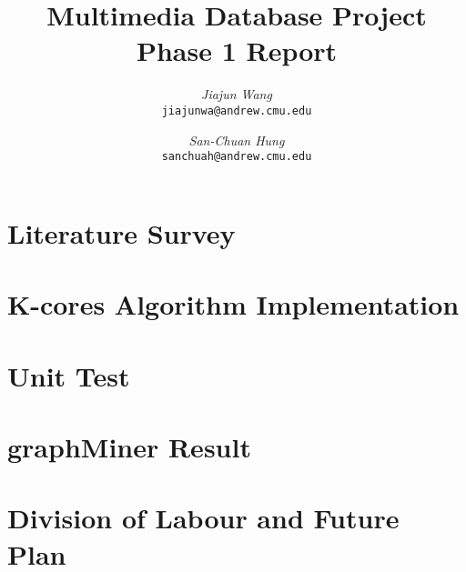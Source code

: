 \documentclass[12pt]{article}
\begin{document}
\newcommand{\beq}{\begin{equation}}
\newcommand{\eeq}{\end{equation}}
\newcommand{\bit}{\begin{itemize*}}
\newcommand{\eit}{\end{itemize*}}
\newcommand{\goal}[1]{ {\noindent {$\Rightarrow$} \em {#1} } }
\newcommand{\hide}[1]{}
\newcommand{\comment}[1]{ {\footnotesize {#1} } }
\newtheorem{lemma}{Lemma}
\newtheorem{theorem}{Theorem}
\newtheorem{proof}{Proof}
\newtheorem{defn}{Definition}
\newtheorem{algo}{Algorithm}
\newtheorem{observation}{Observation}

\title{Multimedia Database Project Phase 1 Report}


\author{ {\em Jiajun Wang} \\
	    {\tt jiajunwa@andrew.cmu.edu}
	 \and
	 {\em San-Chuan Hung} \\
	     {\tt sanchuah@andrew.cmu.edu}
}

\maketitle
\section{Literature Survey}
    \label{sec:survey}
    

\section{K-cores Algorithm Implementation}
    \label{sec:kcor}
    

\section{Unit Test}
    \label{sec:unittest}
    

\section{graphMiner Result}
    \label{sec:graphminer}
    
    
\section{Division of Labour and Future Plan}
    \label{sec:divisionoflabour}
    



\end{document}
